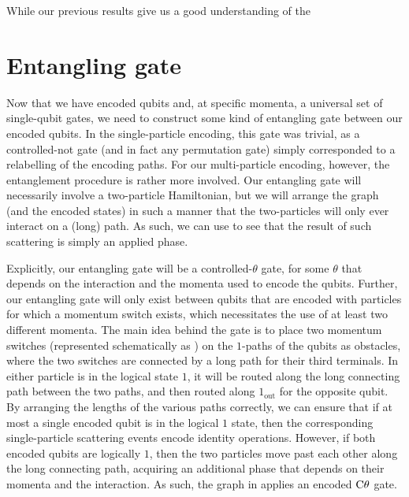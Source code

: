 \documentclass[../thesis-main/thesis-main]{subfiles}
\begin{document}

While our previous results give us a good understanding of the 

%

\section{Entangling gate}


Now that we have encoded qubits and, at specific momenta, a universal set of single-qubit gates, we need to construct some kind of entangling gate between our encoded qubits.  In the single-particle encoding, this gate was trivial, as a controlled-not gate (and in fact any permutation gate) simply corresponded to a relabelling of the encoding paths.  For our multi-particle encoding, however, the entanglement procedure is rather more involved.  Our entangling gate will necessarily involve a two-particle Hamiltonian, but we will arrange the graph (and the encoded states) in such a manner that the two-particles will only ever interact on a (long) path.  As such, we can use  to see that the result of such scattering is simply an applied phase.  

Explicitly, our entangling gate will be a controlled-$\theta$ gate, for some $\theta$ that depends on the interaction and the momenta used to encode the qubits.  Further, our entangling gate will only exist between qubits that are encoded with particles for which a momentum switch  exists, which necessitates the use of at least two different momenta.  The main idea behind the gate is to place two momentum switches (represented schematically as ) on the $1$-paths of the qubits as obstacles, where the two switches are connected by a long path for their third terminals.  In either particle is in the logical state $1$, it will be routed along the long connecting path between the two paths, and then routed along $1_{\text{out}}$ for the opposite qubit.  By arranging the lengths of the various paths correctly, we can ensure that if at most a single encoded qubit is in the logical $1$ state, then the corresponding single-particle scattering events encode identity operations.  However, if both encoded qubits are logically $1$, then the two particles move past each other along the long connecting path, acquiring an additional phase that depends on their momenta and the interaction.  As such, the graph in  applies an encoded $\mathrm{C}\theta$ gate.
\end{document}
